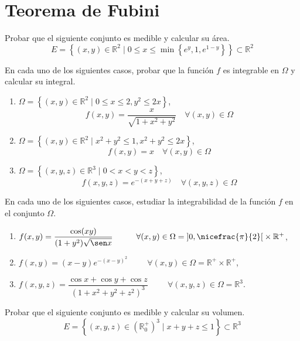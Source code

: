 \section{Teorema de Fubini}

\begin{ejercicio}
    Probar que el siguiente conjunto es medible y calcular su área.
    \[ E = \left\{ (x, y) \in \mathbb{R}^2 \mid 0 \leq x \leq \min \left\{ e^y , 1 , e^{1-y} \right\} \right\} \subset \mathbb{R}^2 \]
\end{ejercicio}

\begin{ejercicio}
    En cada uno de los siguientes casos, probar que la función \( f \) es integrable en \( \Omega \) y calcular su integral.
    \begin{enumerate}
        \item \(\Omega = \left\{ (x, y) \in \mathbb{R}^2 \mid 0 \leq x \leq 2 , y^2 \leq 2x \right\} \),
        \[ f(x, y) = \frac{x}{\sqrt{1 + x^2 + y^2}} \quad \forall (x, y) \in \Omega \]

        \item \(\Omega = \left\{ (x, y) \in \mathbb{R}^2 \mid x^2 + y^2 \leq 1 , x^2 + y^2 \leq 2x \right\} \),
        \[ f(x, y) = x \quad \forall (x, y) \in \Omega \]

        \item \(\Omega = \left\{ (x, y, z) \in \mathbb{R}^3 \mid 0 < x < y < z \right\} \),
        \[ f(x, y, z) = e^{-(x+y+z)} \quad \forall (x, y, z) \in \Omega \]
    \end{enumerate}

\end{ejercicio}

\begin{ejercicio}
    En cada uno de los siguientes casos, estudiar la integrabilidad de la función \( f \) en el conjunto \( \Omega \).
    \begin{enumerate}
        \item $f(x, y) = \dfrac{\cos (x y)}{(1 + y^2) \sqrt{\sen x}} \hspace{1cm} \forall (x, y) \in \Omega= \left]0, \nicefrac{\pi}{2}\right[ \times \mathbb{R}^+$,
        \item $f(x, y) = (x - y) e^{-(x-y)^2} \hspace{1cm} \forall (x, y) \in \Omega= \mathbb{R}^+ \times \mathbb{R}^+$,
        \item $f(x, y, z) = \dfrac{\cos x + \cos y + \cos z}{(1 + x^2 + y^2 + z^2)^3} \hspace{1cm} \forall (x, y, z) \in \Omega= \mathbb{R}^3$.
    \end{enumerate}
\end{ejercicio}

\begin{ejercicio}
    Probar que el siguiente conjunto es medible y calcular su volumen.
    \[ E = \left\{ (x, y, z) \in \left(\mathbb{R}^+_0\right)^3 \mid x + y + z \leq 1 \right\} \subset \mathbb{R}^3 \]
\end{ejercicio}
    